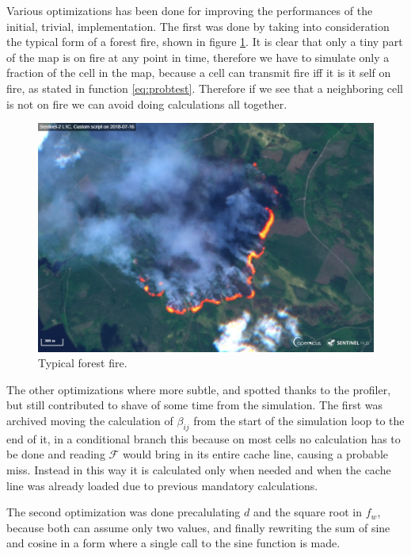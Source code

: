 \documentclass[Lau]{sapthesis} %
\begin{document}
Various optimizations has been done for improving the performances of the
initial, trivial, implementation. The first was done by taking into
consideration the typical form of a forest fire, shown in figure \ref{fig:fire}.
It is clear that only a tiny part of the map is on fire at any point in time,
therefore we have to simulate only a fraction of the cell in the map, because a
cell can transmit fire iff it is it self on fire, as stated in function
\ref{eq:probtest}. Therefore if we see that a neighboring cell is not on fire
we can avoid doing calculations all together.

\begin{figure}
\centering
\includegraphics[scale=0.3]{fire.jpg}
\caption{Typical forest fire.}
\label{fig:fire}
\end{figure}

The other optimizations where more subtle, and spotted thanks to the profiler,
but still contributed to shave of some time from the simulation. The first was
archived moving the calculation of $\beta_{ij}$ from the start of the simulation
loop to the end of it, in a conditional branch this because on most cells no
calculation has to be done and reading $\mathcal{F}$ would bring in its entire
cache line, causing a probable miss. Instead in this way it is calculated only
when needed and when the cache line was already loaded due to previous mandatory
calculations.

The second optimization was done precalulating $d$ and the square root in $f_w$,
because both can assume only two values, and finally rewriting the sum of sine
and cosine in a form where a single call to the sine function is made.
\end{document}
